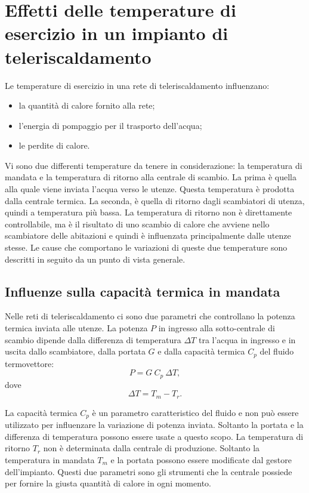 \documentclass[laurea,oneside,11pt]{USiena_tesiLM3}
\begin{document}
\section{Effetti delle temperature di esercizio in un impianto di teleriscaldamento}
Le temperature di esercizio in una rete di teleriscaldamento  influenzano:
\begin{itemize}
\item la quantità di calore fornito alla rete;
\item l'energia di pompaggio per il trasporto dell'acqua;
\item le perdite di calore.
\end{itemize}

Vi sono due differenti temperature da tenere in considerazione: la temperatura di mandata e la temperatura di ritorno alla centrale di scambio. La prima è quella alla quale viene inviata l'acqua verso le utenze. Questa temperatura è prodotta dalla centrale termica. La seconda, è quella di ritorno dagli scambiatori di utenza, quindi a temperatura più bassa. La temperatura di ritorno non è direttamente controllabile, ma è il risultato di uno scambio di calore che avviene nello scambiatore delle abitazioni e quindi è influenzata principalmente dalle utenze stesse.
Le cause che comportano le variazioni di queste due temperature sono descritti in seguito da un punto di vista generale. 

\subsection{Influenze sulla capacità termica in mandata}
Nelle reti di teleriscaldamento ci sono due parametri che controllano la potenza termica inviata alle utenze. La potenza $P$ in ingresso alla sotto-centrale di scambio dipende dalla differenza di temperatura  $\Delta T$ tra l'acqua in ingresso e  in uscita dallo scambiatore, dalla portata $G$ e dalla capacità termica $C_p$ del fluido termovettore:
\begin{equation}
P = G \ C_p \ \Delta T ,
\label{eq:Potenza}
\end{equation} 
dove
\begin{equation}
\Delta T = T_{m} - T_{r} .
\label{eq:dT}
\end{equation}

La capacità termica $C_p$ è un parametro caratteristico del fluido e non può essere utilizzato per influenzare la variazione di potenza inviata. Soltanto la portata e la differenza di temperatura   possono essere usate a questo scopo. La temperatura di ritorno $T_{r}$ non è determinata dalla centrale di produzione. Soltanto la temperatura in mandata $T_{m}$ e la portata possono essere modificate dal gestore dell'impianto.
Questi due parametri sono gli strumenti che la centrale possiede per fornire la giusta quantità di calore in ogni momento.
\end{document}
